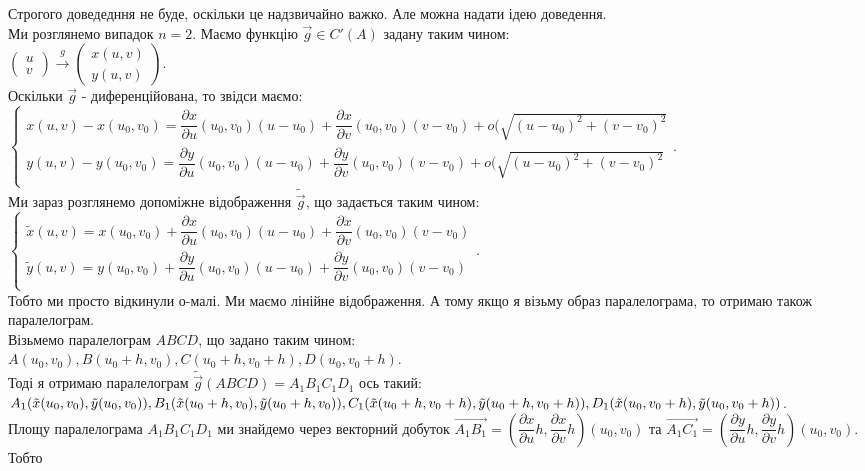 \documentclass[a4paper, 10pt]{article}
\def\departial#1#2{\dfrac{\partial {#1}}{\partial {#2}}}
\theoremstyle{theoremdd}
\theoremstyle{theoremdd}
\theoremstyle{theoremdd}
\theoremstyle{theoremdd}
\theoremstyle{theoremdd}
\theoremstyle{theoremdd}
\theoremstyle{theoremdd}
\theoremstyle{theoremdd}
\theoremstyle{theoremdd}
\theoremstyle{theoremdd}
\theoremstyle{theoremdd}
\theoremstyle{theoremdd}
\theoremstyle{theoremdd}
\theoremstyle{theoremdd}
\theoremstyle{theoremdd}
\begin{document}
Строгого доведедння не буде, оскільки це надзвичайно важко. Але можна надати ідею доведення.
\bigskip \\
Ми розглянемо випадок $n = 2$. Маємо функцію $\vec{g} \in C'(A)$ задану таким чином:\\
$\begin{pmatrix}
u \\ v
\end{pmatrix} \overset{g}{\to} \begin{pmatrix}
x(u,v) \\ y(u,v)
\end{pmatrix}$.\\
Оскільки $\vec{g}$ - диференційована, то звідси маємо:\\
$\begin{cases}
x(u,v) - x(u_0,v_0) = \departial{x}{u}(u_0,v_0)(u-u_0) + \departial{x}{v}(u_0,v_0)(v-v_0) + o( \sqrt{(u-u_0)^2 + (v-v_0)^2} \\
y(u,v) - y(u_0,v_0) = \departial{y}{u}(u_0,v_0)(u-u_0) + \departial{y}{v}(u_0,v_0)(v-v_0) + o( \sqrt{(u-u_0)^2 + (v-v_0)^2} \\
\end{cases}$.\\
Ми зараз розглянемо допоміжне відображення $\tilde{\vec{g}}$, що задається таким чином:\\
$\begin{cases}
\tilde{x}(u,v) = x(u_0,v_0) + \departial{x}{u}(u_0,v_0)(u-u_0) + \departial{x}{v}(u_0,v_0)(v-v_0) \\
\tilde{y}(u,v) =  y(u_0,v_0) +\departial{y}{u}(u_0,v_0)(u-u_0) + \departial{y}{v}(u_0,v_0)(v-v_0) \\
\end{cases}$.\\
Тобто ми просто відкинули о-малі. Ми маємо лінійне відображення. А тому якщо я візьму образ паралелограма, то отримаю також паралелограм.\\
Візьмемо паралелограм $ABCD$, що задано таким чином:\\ $A(u_0,v_0), B(u_0+h,v_0), C(u_0+h,v_0+h), D(u_0,v_0+h)$.\\
Тоді я отримаю паралелограм $\tilde{\vec{g}}(ABCD) = A_1B_1C_1D_1$ ось такий:\\
$A_1(\tilde{x}(u_0,v_0),\tilde{y}(u_0,v_0)),B_1(\tilde{x}(u_0+h,v_0),\tilde{y}(u_0+h,v_0)),C_1(\tilde{x}(u_0+h,v_0+h),\tilde{y}(u_0+h,v_0+h)),\\ D_1(\tilde{x}(u_0,v_0+h),\tilde{y}(u_0,v_0+h))$.\\
Площу паралелограма $A_1B_1C_1D_1$ ми знайдемо через векторний добуток $\overrightarrow{A_1B_1} = \left( \departial{x}{u}h, \departial{x}{v}h \right)(u_0,v_0)$ та $\overrightarrow{A_1C_1} = \left( \departial{y}{u}h, \departial{y}{v}h \right)(u_0,v_0)$. Тобто\\
\end{document}
